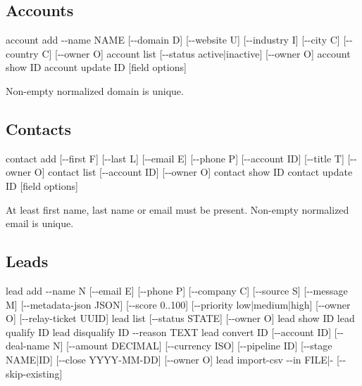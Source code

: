 \documentclass[
]{article}
\newenvironment{Shaded}{}{}
\newcommand{\NormalTok}[1]{#1}
\begin{document}
\subsection{Accounts}\label{accounts}

\begin{Shaded}
\begin{Highlighting}[]
\NormalTok{account add {-}{-}name NAME [{-}{-}domain D] [{-}{-}website U] [{-}{-}industry I] [{-}{-}city C] [{-}{-}country C] [{-}{-}owner O]}
\NormalTok{account list [{-}{-}status active|inactive] [{-}{-}owner O]}
\NormalTok{account show ID}
\NormalTok{account update ID [field options]}
\end{Highlighting}
\end{Shaded}

Non-empty normalized domain is unique.

\subsection{Contacts}\label{contacts}

\begin{Shaded}
\begin{Highlighting}[]
\NormalTok{contact add [{-}{-}first F] [{-}{-}last L] [{-}{-}email E] [{-}{-}phone P] [{-}{-}account ID] [{-}{-}title T] [{-}{-}owner O]}
\NormalTok{contact list [{-}{-}account ID] [{-}{-}owner O]}
\NormalTok{contact show ID}
\NormalTok{contact update ID [field options]}
\end{Highlighting}
\end{Shaded}

At least first name, last name or email must be present. Non-empty
normalized email is unique.

\subsection{Leads}\label{leads}

\begin{Shaded}
\begin{Highlighting}[]
\NormalTok{lead add {-}{-}name N [{-}{-}email E] [{-}{-}phone P] [{-}{-}company C] [{-}{-}source S] [{-}{-}message M]}
\NormalTok{         [{-}{-}metadata{-}json JSON] [{-}{-}score 0..100] [{-}{-}priority low|medium|high]}
\NormalTok{         [{-}{-}owner O] [{-}{-}relay{-}ticket UUID]}
\NormalTok{lead list [{-}{-}status STATE] [{-}{-}owner O]}
\NormalTok{lead show ID}
\NormalTok{lead qualify ID}
\NormalTok{lead disqualify ID {-}{-}reason TEXT}
\NormalTok{lead convert ID [{-}{-}account ID] [{-}{-}deal{-}name N] [{-}{-}amount DECIMAL] [{-}{-}currency ISO]}
\NormalTok{                [{-}{-}pipeline ID] [{-}{-}stage NAME|ID] [{-}{-}close YYYY{-}MM{-}DD] [{-}{-}owner O]}
\NormalTok{lead import{-}csv {-}{-}in FILE|{-} [{-}{-}skip{-}existing]}
\end{Highlighting}
\end{Shaded}
\end{document}

